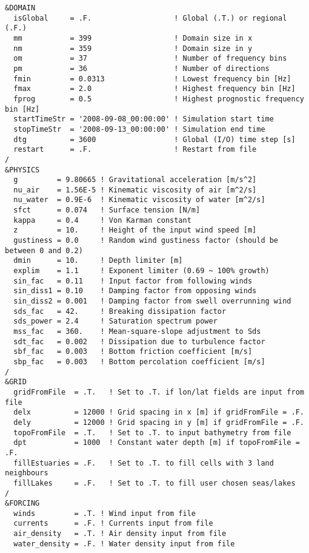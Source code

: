 \documentclass[letterpaper]{article}
\numberwithin{equation}{section}
\begin{document}
\begin{verbatim}
&DOMAIN
  isGlobal     = .F.                   ! Global (.T.) or regional (.F.)
  mm           = 399                   ! Domain size in x
  nm           = 359                   ! Domain size in y
  om           = 37                    ! Number of frequency bins
  pm           = 36                    ! Number of directions
  fmin         = 0.0313                ! Lowest frequency bin [Hz]
  fmax         = 2.0                   ! Highest frequency bin [Hz]
  fprog        = 0.5                   ! Highest prognostic frequency bin [Hz]
  startTimeStr = '2008-09-08_00:00:00' ! Simulation start time
  stopTimeStr  = '2008-09-13_00:00:00' ! Simulation end time
  dtg          = 3600                  ! Global (I/O) time step [s]
  restart      = .F.                   ! Restart from file
/
&PHYSICS
  g         = 9.80665 ! Gravitational acceleration [m/s^2]
  nu_air    = 1.56E-5 ! Kinematic viscosity of air [m^2/s]
  nu_water  = 0.9E-6  ! Kinematic viscosity of water [m^2/s]
  sfct      = 0.074   ! Surface tension [N/m]
  kappa     = 0.4     ! Von Karman constant
  z         = 10.     ! Height of the input wind speed [m]
  gustiness = 0.0     ! Random wind gustiness factor (should be between 0 and 0.2)
  dmin      = 10.     ! Depth limiter [m]
  explim    = 1.1     ! Exponent limiter (0.69 ~ 100% growth)
  sin_fac   = 0.11    ! Input factor from following winds
  sin_diss1 = 0.10    ! Damping factor from opposing winds
  sin_diss2 = 0.001   ! Damping factor from swell overrunning wind
  sds_fac   = 42.     ! Breaking dissipation factor
  sds_power = 2.4     ! Saturation spectrum power
  mss_fac   = 360.    ! Mean-square-slope adjustment to Sds
  sdt_fac   = 0.002   ! Dissipation due to turbulence factor
  sbf_fac   = 0.003   ! Bottom friction coefficient [m/s]
  sbp_fac   = 0.003   ! Bottom percolation coefficient [m/s]
/
&GRID
  gridFromFile  = .T.   ! Set to .T. if lon/lat fields are input from file
  delx          = 12000 ! Grid spacing in x [m] if gridFromFile = .F.
  dely          = 12000 ! Grid spacing in y [m] if gridFromFile = .F.
  topoFromFile  = .T.   ! Set to .T. to input bathymetry from file
  dpt           = 1000  ! Constant water depth [m] if topoFromFile = .F.
  fillEstuaries = .F.   ! Set to .T. to fill cells with 3 land neighbours
  fillLakes     = .F.   ! Set to .T. to fill user chosen seas/lakes
/
&FORCING
  winds         = .T. ! Wind input from file
  currents      = .F. ! Currents input from file
  air_density   = .T. ! Air density input from file
  water_density = .F. ! Water density input from file

\end{verbatim}
\end{document}
